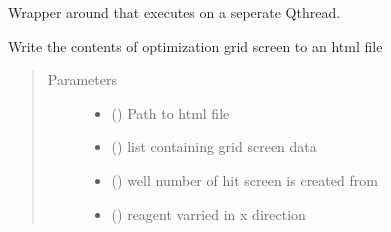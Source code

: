 \documentclass[letterpaper,10pt,english]{sphinxmanual}
\begin{document}
\begin{fulllineitems}

\begin{fulllineitems}
\label{\detokenize{polo.utils:polo.utils.io_utils.HtmlWriter.write_complete_run_on_thread}}
Wrapper around  that executes on a seperate
Qthread.

\end{fulllineitems}


\begin{fulllineitems}
\label{\detokenize{polo.utils:polo.utils.io_utils.HtmlWriter.write_grid_screen}}
Write the contents of optimization grid screen to an html file
\begin{quote}\begin{description}
\item[{Parameters}] \leavevmode\begin{itemize}
\item {} 
 () \textendash{} Path to html file

\item {} 
 () \textendash{} list containing grid screen data

\item {} 
 () \textendash{} well number of hit screen is created from

\item {} 
 ({\hyperref[\detokenize{polo.crystallography:polo.crystallography.cocktail.Reagent}]{}}) \textendash{} reagent varried in x direction


\end{itemize}
\end{description}
\end{quote}
\end{fulllineitems}
\end{fulllineitems}
\end{document}
